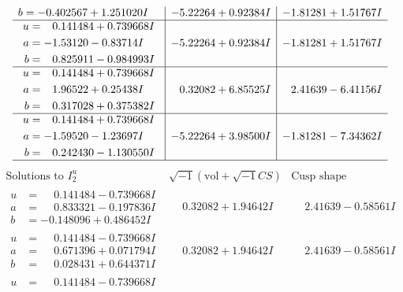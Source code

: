 \documentclass[1p]{elsarticle_modified}
\theoremstyle{definition}
\newcommand{\I}{\sqrt{-1}}
\begin{document}
$$\begin{array}{c|c|c}
\begin{aligned}
b &= -0.402567 + 1.251020 I\end{aligned}
 & -5.22264 + 0.92384 I & -1.81281 + 1.51767 I \\ \hline\begin{aligned}
u &= \phantom{-}0.141484 + 0.739668 I \\
a &= -1.53120 - 0.83714 I \\
b &= \phantom{-}0.825911 - 0.984993 I\end{aligned}
 & -5.22264 + 0.92384 I & -1.81281 + 1.51767 I \\ \hline\begin{aligned}
u &= \phantom{-}0.141484 + 0.739668 I \\
a &= \phantom{-}1.96522 + 0.25438 I \\
b &= \phantom{-}0.317028 + 0.375382 I\end{aligned}
 & \phantom{-}0.32082 + 6.85525 I & \phantom{-}2.41639 - 6.41156 I \\ \hline\begin{aligned}
u &= \phantom{-}0.141484 + 0.739668 I \\
a &= -1.59520 - 1.23697 I \\
b &= \phantom{-}0.242430 - 1.130550 I\end{aligned}
 & -5.22264 + 3.98500 I & -1.81281 - 7.34362 I\\
 \hline 
 \end{array}$$\newpage$$\begin{array}{c|c|c}  
\text{Solutions to }I^u_{2}& \I (\text{vol} + \sqrt{-1}CS) & \text{Cusp shape}\\
 \hline 
\begin{aligned}
u &= \phantom{-}0.141484 - 0.739668 I \\
a &= \phantom{-}0.833321 - 0.197836 I \\
b &= -0.148096 + 0.486452 I\end{aligned}
 & \phantom{-}0.32082 + 1.94642 I & \phantom{-}2.41639 - 0.58561 I \\ \hline\begin{aligned}
u &= \phantom{-}0.141484 - 0.739668 I \\
a &= \phantom{-}0.671396 + 0.071794 I \\
b &= \phantom{-}0.028431 + 0.644371 I\end{aligned}
 & \phantom{-}0.32082 + 1.94642 I & \phantom{-}2.41639 - 0.58561 I \\ \hline\begin{aligned}
u &= \phantom{-}0.141484 - 0.739668 I \\

\end{aligned}
\end{array}$$
\end{document}
